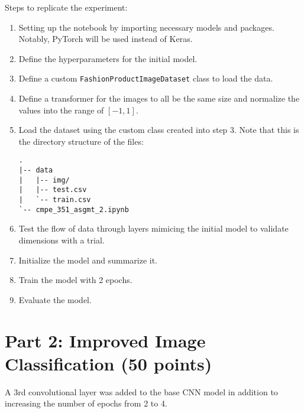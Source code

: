 \documentclass[
  coursecode={CMPE 351},
  assignmentname={Assignment 2},
  studentnumber=20053722,
  name={Bryan Hoang (16bch1)},
  draft,
  date=2020-03-07,
]{
  ltxanswer%
}
\begin{document}
  Steps to replicate the experiment:
  \begin{enumerate}
    \item Setting up the notebook by importing necessary models and packages. Notably, PyTorch will be used instead of Keras.
    \item Define the hyperparameters for the initial model.
    \item Define a custom \texttt{FashionProductImageDataset} class to load the data.
    \item Define a transformer for the images to all be the same size and normalize the values into the range of \([-1, 1]\).
    \item Load the dataset using the custom class created into step 3. Note that this is the directory structure of the files:
          \begin{verbatim}
.
|-- data
|   |-- img/
|   |-- test.csv
|   `-- train.csv
`-- cmpe_351_asgmt_2.ipynb
    \end{verbatim}
    \item Test the flow of data through layers mimicing the initial model to validate dimensions with a trial.
    \item Initialize the model and summarize it.
    \item Train the model with 2 epochs.
    \item Evaluate the model.
  \end{enumerate}

  \section{Part 2: Improved Image Classification (50 points)}

  A 3rd convolutional layer was added to the base CNN model in addition to increasing the number of epochs from 2 to 4.
\end{document}
